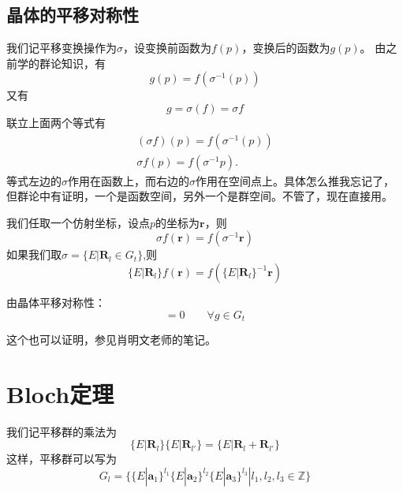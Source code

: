 \subsection{晶体的平移对称性}
我们记平移变换操作为$\sigma$，设变换前函数为$f(p)$，变换后的函数为$g(p)$。
由之前学的群论知识，有
\begin{equation}
    g(p) = f(\sigma^{-1}(p)) 
\end{equation}
又有
\begin{equation}
    g =\sigma(f) = \sigma f
\end{equation}
联立上面两个等式有
\begin{equation}
\begin{aligned}
        (\sigma f) (p) = f(\sigma^{-1}(p))  \\
        \sigma f(p) = f(\sigma^{-1}p).
\end{aligned}
\end{equation}
等式左边的$\sigma$作用在函数上，而右边的$\sigma$作用在空间点上。具体怎么推我忘记了，但群论中有证明，一个是函数空间，另外一个是群空间。不管了，现在直接用。
\par 我们任取一个仿射坐标，设点$p$的坐标为$\mathbf{r}$，则
\begin{equation}
    \sigma f(\mathbf{r}) = f(\sigma^{-1} \mathbf{r})
\end{equation}
如果我们取$\sigma = \{E| \mathbf{R}_l \in G_t\}$,则
\begin{equation}
    \{E| \mathbf{R}_l\} f(\mathbf{r}) = f( \{E| \mathbf{R}_l\}^{-1} \mathbf{r})
\end{equation}
\par 由晶体平移对称性：
\begin{equation}
[g,H] = 0   \qquad \forall g \in G_t
\end{equation}

这个也可以证明，参见肖明文老师的笔记。
\section{Bloch定理}
我们记平移群的乘法为
\begin{equation}
    \{E| \mathbf{R}_l\} \{E| \mathbf{R}_{l'}\} = \{E| \mathbf{R}_l + \mathbf{R}_{l'}\}
\end{equation}
这样，平移群可以写为
\begin{equation}
    G_l = \{\{E|\mathbf{a}_1\}^{l_1}\{E|\mathbf{a}_2\}^{l_2}\{E|\mathbf{a}_3\}^{l_3} | l_1,l_2,l_3 \in \mathbb{Z}\}
\end{equation}

